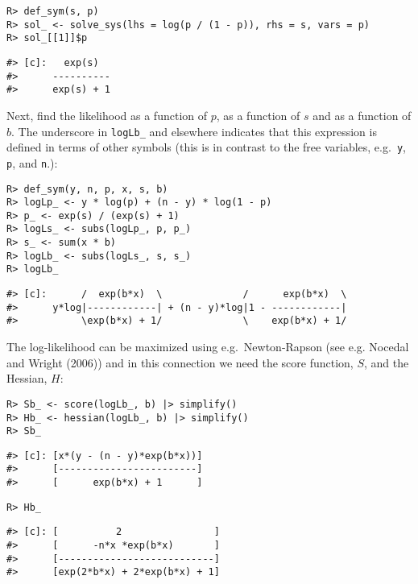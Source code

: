 \begin{verbatim}
R> def_sym(s, p)
R> sol_ <- solve_sys(lhs = log(p / (1 - p)), rhs = s, vars = p)
R> sol_[[1]]$p
\end{verbatim}

\begin{verbatim}
#> [c]:   exp(s)  
#>      ----------
#>      exp(s) + 1
\end{verbatim}

Next, find the likelihood as a function of \(p\), as a function of \(s\) and as a function of \(b\).
The underscore in \texttt{logLb\_} and elsewhere indicates that this expression
is defined in terms of other symbols (this is in contrast
to the free variables, e.g.~\texttt{y}, \texttt{p}, and \texttt{n}.):

\begin{verbatim}
R> def_sym(y, n, p, x, s, b)
R> logLp_ <- y * log(p) + (n - y) * log(1 - p)
R> p_ <- exp(s) / (exp(s) + 1)
R> logLs_ <- subs(logLp_, p, p_)
R> s_ <- sum(x * b)
R> logLb_ <- subs(logLs_, s, s_)
R> logLb_
\end{verbatim}

\begin{verbatim}
#> [c]:      /  exp(b*x)  \              /      exp(b*x)  \
#>      y*log|------------| + (n - y)*log|1 - ------------|
#>           \exp(b*x) + 1/              \    exp(b*x) + 1/
\end{verbatim}

The log-likelihood can be maximized using e.g.~Newton-Rapson (see e.g. Nocedal and Wright (2006)) and in this connection we
need the score function, \(S\), and the Hessian, \(H\):

\begin{verbatim}
R> Sb_ <- score(logLb_, b) |> simplify()
R> Hb_ <- hessian(logLb_, b) |> simplify()
R> Sb_
\end{verbatim}

\begin{verbatim}
#> [c]: [x*(y - (n - y)*exp(b*x))]
#>      [------------------------]
#>      [      exp(b*x) + 1      ]
\end{verbatim}

\begin{verbatim}
R> Hb_
\end{verbatim}

\begin{verbatim}
#> [c]: [          2                ]
#>      [      -n*x *exp(b*x)       ]
#>      [---------------------------]
#>      [exp(2*b*x) + 2*exp(b*x) + 1]
\end{verbatim}

